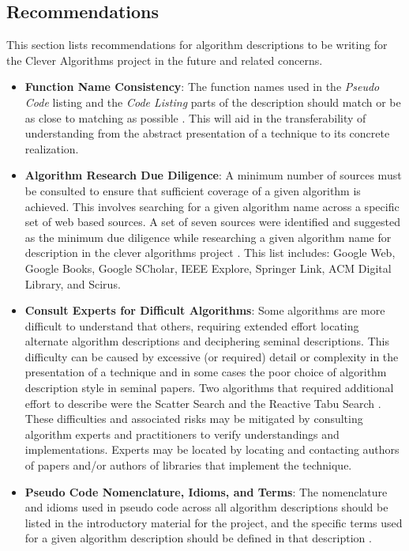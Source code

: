 \documentclass[a4paper, 11pt]{article}
\begin{document}
% 
% 
\subsection{Recommendations}
This section lists recommendations for algorithm descriptions to be writing for the Clever Algorithms project in the future and related concerns. 

\begin{itemize}
	\item \textbf{Function Name Consistency}: The function names used in the \emph{Pseudo Code} listing and the \emph{Code Listing} parts of the description should match or be as close to matching as possible \cite{Brownlee2010g}. This will aid in the transferability of understanding from the abstract presentation of a technique to its concrete realization.
	\item \textbf{Algorithm Research Due Diligence}: A minimum number of sources must be consulted to ensure that sufficient coverage of a given algorithm is achieved. This involves searching for a given algorithm name across a specific set of web based sources. A set of seven sources were identified and suggested as the minimum due diligence while researching a given algorithm name for description in the clever algorithms project \cite{Brownlee2010h}. This list includes: Google Web, Google Books, Google SCholar, IEEE Explore, Springer Link, ACM Digital Library, and Scirus.
	\item \textbf{Consult Experts for Difficult Algorithms}: Some algorithms are more difficult to understand that others, requiring extended effort locating alternate algorithm descriptions and deciphering seminal descriptions.  This difficulty can be caused by excessive (or required) detail or complexity in the presentation of a technique and in some cases the poor choice of algorithm description style in seminal papers. Two algorithms that required additional effort to describe were the Scatter Search \cite{Brownlee2010l} and the Reactive Tabu Search \cite{Brownlee2010m}. These difficulties and associated risks may be mitigated by consulting algorithm experts and practitioners to verify understandings and implementations. Experts may be located by locating and contacting authors of papers and/or authors of libraries that implement the technique. 
	\item \textbf{Pseudo Code Nomenclature, Idioms, and Terms}: The nomenclature and idioms used in pseudo code across all algorithm descriptions should be listed in the introductory material for the project, and the specific terms used for a given algorithm description should be defined in that description \cite{Brownlee2010m}.		

\end{itemize}
\end{document}
